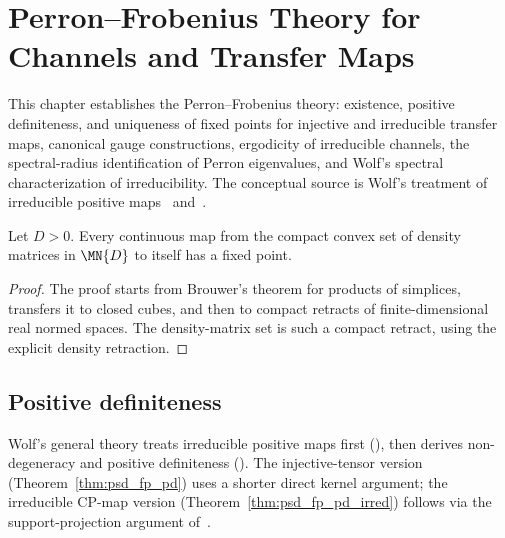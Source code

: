 \chapter{Perron--Frobenius Theory for Channels and Transfer Maps}\label{ch:qpf}

This chapter establishes the Perron--Frobenius theory:
existence, positive definiteness, and uniqueness of
fixed points for injective and irreducible transfer maps, canonical
gauge constructions, ergodicity of irreducible channels, the
spectral-radius identification of Perron eigenvalues, and Wolf's
spectral characterization of irreducibility.
The conceptual source is Wolf's treatment of irreducible positive
maps~\cite[Chapter~6, especially Theorems~6.2--6.5 and Corollary~6.3]{Wolf2012Quantum}
and~\cite{Evans1978Spectral}.

\begin{theorem}%
    \label{thm:brouwer_density_matrices}
    \leanok
    Let $D > 0$. Every continuous map from the compact convex set of
    density matrices in $\MN{D}$ to itself has a fixed point.
\end{theorem}

\begin{proof}
    \leanok
    The proof starts from Brouwer's theorem for products of simplices,
    transfers it to closed cubes, and then to compact retracts of
    finite-dimensional real normed spaces. The density-matrix set is
    such a compact retract, using the explicit density retraction.
\end{proof}

\section{Positive definiteness}

\begin{remark}\leanok
    Wolf's general theory treats irreducible positive maps first
    (\cite[Theorem~6.2]{Wolf2012Quantum}), then derives non-degeneracy
    and positive definiteness (\cite[Theorem~6.3]{Wolf2012Quantum}).
    The injective-tensor version (Theorem~\ref{thm:psd_fp_pd}) uses
    a shorter direct kernel argument; the irreducible
    CP-map version (Theorem~\ref{thm:psd_fp_pd_irred}) follows
    via the support-projection argument of~\cite[Theorem~6.2]{Wolf2012Quantum}.
\end{remark}


